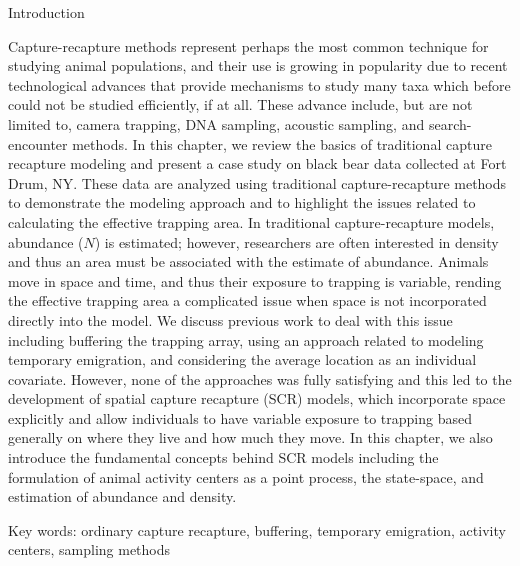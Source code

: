 
Introduction


Capture-recapture methods represent perhaps the most common technique
for studying animal populations, and their use is growing in
popularity due to recent technological advances that provide mechanisms
to study many taxa which before could not be studied efficiently, if
at all. These advance include,
but are not limited to, camera trapping, DNA sampling, acoustic sampling, and 
search-encounter methods.   In this chapter, we review the basics of traditional
capture recapture modeling and present a case study on black bear data collected at Fort Drum, NY.
These data are analyzed using traditional capture-recapture methods to demonstrate the modeling
approach and to highlight the issues related to calculating the effective trapping area.  In traditional
capture-recapture models, abundance ($N$) is estimated; however, researchers are often interested in
density and thus an area must be associated with the estimate of abundance.  Animals move in space 
and time, and thus their exposure to trapping is variable, rending the effective trapping area a 
complicated issue when space is not incorporated directly into the model.  We discuss previous work to deal 
with this issue including buffering the trapping array, using an approach related to modeling temporary emigration, 
and considering the average location as an individual covariate.  However, none of the approaches was fully 
satisfying and this led to the development of spatial capture recapture (SCR) models, which incorporate space 
explicitly and allow individuals to have variable exposure to trapping based generally on where they live 
and how much they move.   In this chapter, we also introduce the fundamental concepts behind SCR models 
including the formulation of animal activity centers as a point process, the state-space, 
and estimation of abundance and density.

Key words:  ordinary capture recapture, buffering, temporary emigration, activity centers, sampling methods





